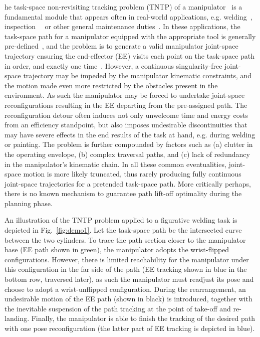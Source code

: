 \documentclass[letterpaper, 10 pt, journal, twoside]{ieeetran}  %
\begin{document}
he task-space non-revisiting tracking problem (TNTP) of a manipulator~\cite{Liang2010Adaptive} is a fundamental module that appears often in real-world applications, e.g.  welding~\cite{Norberto2003Welding}, inspection~\cite{Nakhaeinia2013Trajectory}~\cite{Simetti2016Underwater} or other general maintenance duties~\cite{Simetti2016Underwater}. 
In these applications, the task-space path for a manipulator equipped with the appropriate tool is generally pre-defined~\cite{Chen2019Synchronization}, and the problem is to generate a valid manipulator joint-space trajectory ensuring the end-effector (EE)  visits each point on the task-space path in order, and exactly one time~\cite{Janiak2017Motion}. 
However, a continuous singularity-free joint-space trajectory may be impeded by the manipulator kinematic constraints, and the motion made even more restricted by the obstacles present in the environment. As such the manipulator may be forced to undertake joint-space reconfigurations resulting in the EE departing from the pre-assigned path. 
The reconfiguration detour often induces not only unwelcome time and energy costs from an efficiency standpoint, but also imposes undesirable discontinuities that may have severe effects in the end results of the task at hand, e.g. during welding or painting.  The problem is further compounded by factors such as (a) clutter in the operating envelope, (b) complex traversal paths, and (c) lack of redundancy in the manipulator's kinematic chain. In all these common eventualities, joint-space motion is more likely truncated, thus rarely producing fully continuous joint-space trajectories for a pretended task-space path. More critically perhaps, there is no known mechanism to guarantee path lift-off optimality during the planning phase. 




An illustration of the TNTP problem applied to a figurative welding task is depicted in Fig.~\ref{fig:demo1}. Let the task-space path be the intersected curve between the two cylinders. 
To trace the path section closer to the manipulator base (EE path shown in green), the manipulator adopts the wrist-flipped configurations. 
However, there is limited reachability for the manipulator under this configuration in the far side of the path (EE tracking shown in blue in the bottom row, traversed later), as such the manipulator must readjust its pose and choose to adopt a wrist-unflipped configuration. During the rearrangement, an undesirable motion of the EE path (shown in black) is introduced, together with the inevitable suspension of the path tracking at the point of take-off and re-landing. 
Finally, the manipulator is able to finish the tracking of the desired path with one pose reconfiguration (the latter part of EE tracking is depicted in blue). 
\end{document}
